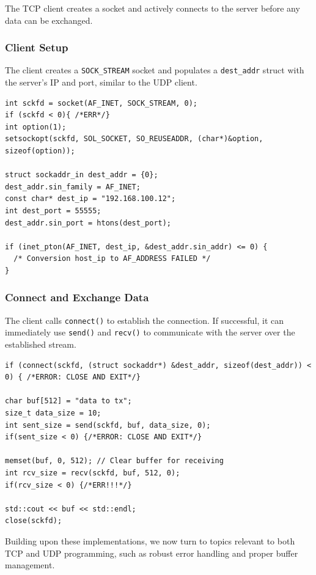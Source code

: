 \documentclass{article}
\begin{document}
The TCP client creates a socket and actively connects to the server before any data can be exchanged.

\subsubsection{Client Setup}

The client creates a \texttt{SOCK\_STREAM} socket and populates a \texttt{dest\_addr} struct with the server's IP and port, similar to the UDP client.

\begin{verbatim}
int sckfd = socket(AF_INET, SOCK_STREAM, 0);
if (sckfd < 0){ /*ERR*/}
int option(1);
setsockopt(sckfd, SOL_SOCKET, SO_REUSEADDR, (char*)&option, sizeof(option));

struct sockaddr_in dest_addr = {0};
dest_addr.sin_family = AF_INET;
const char* dest_ip = "192.168.100.12";
int dest_port = 55555;
dest_addr.sin_port = htons(dest_port);

if (inet_pton(AF_INET, dest_ip, &dest_addr.sin_addr) <= 0) {
  /* Conversion host_ip to AF_ADDRESS FAILED */
}
\end{verbatim}

\subsubsection{Connect and Exchange Data}

The client calls \texttt{connect()} to establish the connection. If successful, it can immediately use \texttt{send()} and \texttt{recv()} to communicate with the server over the established stream.

\begin{verbatim}
if (connect(sckfd, (struct sockaddr*) &dest_addr, sizeof(dest_addr)) < 0) { /*ERROR: CLOSE AND EXIT*/}

char buf[512] = "data to tx";
size_t data_size = 10;
int sent_size = send(sckfd, buf, data_size, 0);
if(sent_size < 0) {/*ERROR: CLOSE AND EXIT*/}

memset(buf, 0, 512); // Clear buffer for receiving
int rcv_size = recv(sckfd, buf, 512, 0);
if(rcv_size < 0) {/*ERR!!!*/}

std::cout << buf << std::endl;
close(sckfd);
\end{verbatim}

Building upon these implementations, we now turn to topics relevant to both TCP and UDP programming, such as robust error handling and proper buffer management.
\end{document}
